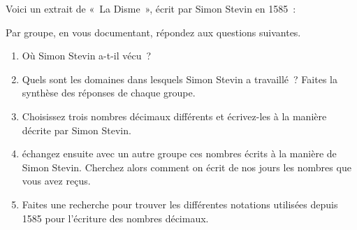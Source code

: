 
\begin{TP}[]
Voici un extrait de « La Disme », écrit par Simon Stevin en 1585 : 



Par groupe, en vous documentant, répondez aux questions suivantes.
\begin{enumerate}
 \item Où Simon Stevin a-t-il vécu ?
 \item Quels sont les domaines dans lesquels Simon Stevin a travaillé ? Faites la synthèse des réponses de chaque groupe.



 \item Choisissez trois nombres décimaux différents et écrivez-les à la manière décrite par Simon Stevin.
 \item échangez ensuite avec un autre groupe ces nombres écrits à la manière de Simon Stevin. Cherchez alors comment on écrit de nos jours les nombres que vous avez reçus.
 \item Faites une recherche pour trouver les différentes notations utilisées depuis 1585 pour l'écriture des nombres décimaux.
 \end{enumerate}
\end{TP}


